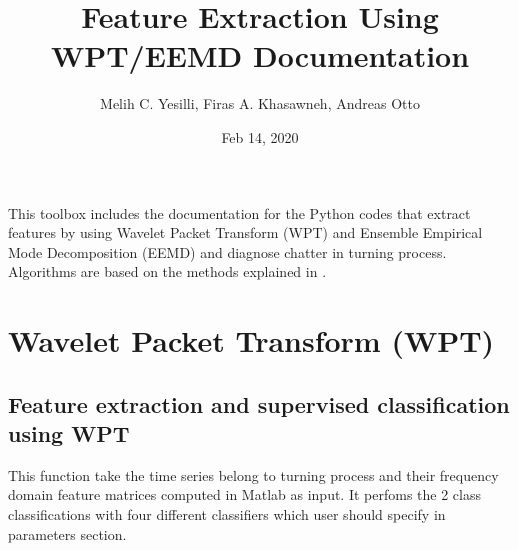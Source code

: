 \documentclass[letterpaper,10pt,english]{sphinxmanual}
\title{Feature Extraction Using WPT/EEMD Documentation}
\date{Feb 14, 2020}
\author{Melih C. Yesilli, Firas A. Khasawneh, Andreas Otto}
\begin{document}
\pagestyle{empty}
\sphinxmaketitle
\pagestyle{plain}
\sphinxtableofcontents
\pagestyle{normal}
\label{\detokenize{index::doc}}


This toolbox includes the documentation for the Python codes that extract features by using Wavelet Packet Transform (WPT)
and Ensemble Empirical Mode Decomposition (EEMD) and diagnose chatter in turning process. Algorithms are based on the methods
explained in .


\chapter{Wavelet Packet Transform (WPT)}
\label{\detokenize{WPT:module-WPT_Feature_Extraction}}\label{\detokenize{WPT:wavelet-packet-transform-wpt}}\label{\detokenize{WPT::doc}}

\section{Feature extraction and supervised classification using WPT}
\label{\detokenize{WPT:feature-extraction-and-supervised-classification-using-wpt}}
This function take the time series belong to turning process and
their frequency domain feature matrices computed in Matlab as input. It perfoms 
the 2 class classifications with four different classifiers which
user should specify in parameters section.
\end{document}
